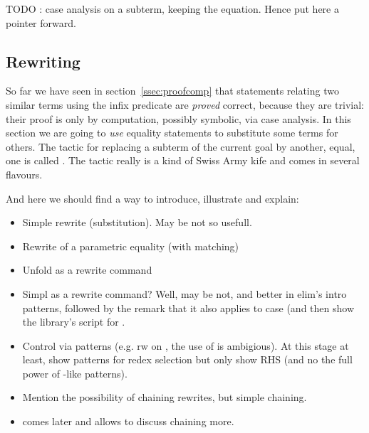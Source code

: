 TODO : case analysis on a subterm, keeping the equation. Hence put
here a pointer forward.
\subsection{Rewriting}

So far we have seen in section~\ref{ssec:proofcomp} that statements
relating two similar terms using the \C{=} infix predicate are \emph{proved}
correct, because they are trivial: their proof is only by
computation, possibly symbolic, via case analysis.
 In this
section we are going to \emph{use} equality statements to substitute
some terms for others. The tactic for replacing a subterm of the
current goal by another, equal, one is called . The
 tactic really is a kind of Swiss Army kife and comes in
several flavours.







And here we should find a way to introduce, illustrate and explain:
\begin{itemize}
\item Simple rewrite (substitution). May be not so usefull.
\item Rewrite of a parametric equality (with matching)
\item Unfold as a rewrite command
\item Simpl as a rewrite command? Well, may be not, and better in
  elim's intro patterns, followed by the remark that it also applies
  to case (and then show the library's script for .
\item Control via patterns (e.g. rw  on
, the use of  is ambigious). At this
stage at least, show patterns for redex selection but only show RHS
(and no the full power of \C{[X in _ <= X]}-like patterns).
\item Mention the possibility of chaining rewrites, but simple chaining.
\item {} comes later and allows to discuss chaining more.
\end{itemize}

